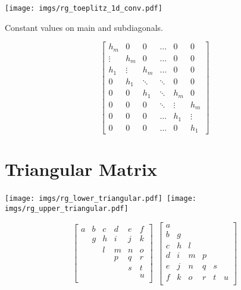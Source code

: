 \begin{center}
\texttt{[image: imgs/rg\_toeplitz\_1d\_conv.pdf]}
\end{center}

Constant values on main and subdiagonals.

\begin{equation}
\begin{bmatrix}
  h_m &   0 &   0 &      \hdots &   0 &   0 \\
  \vdots & h_m &   0 &   \hdots &   0 &   0 \\
  h_1 & \vdots & h_m &   \hdots &   0 &   0 \\
    0 & h_1 & \ddots & \ddots &   0 &   0 \\
    0 &   0 & h_1 &    \ddots & h_m &   0 \\
    0 &   0 &   0 &    \ddots & \vdots & h_m \\
    0 &   0 &   0 &      \hdots & h_1 & \vdots \\
    0 &   0 &   0 &      \hdots &   0 & h_1
\end{bmatrix}
\end{equation}


\section{Triangular Matrix}

\begin{center}
\texttt{[image: imgs/rg\_lower\_triangular.pdf]}~\texttt{[image: imgs/rg\_upper\_triangular.pdf]}
\end{center}

\begin{equation}
\begin{bmatrix}
a & b & c & d & e & f \\
  & g & h & i & j & k \\
  &   & l & m & n & o \\
  &   &   & p & q & r \\
  &   &   &   & s & t \\
  &   &   &   &   & u \\
\end{bmatrix}
~
~
\begin{bmatrix}
a &   &   &   &   &   \\
b & g &   &   &   &   \\
c & h & l &   &   &   \\
d & i & m & p &   &   \\
e & j & n & q & s &   \\
f & k & o & r & t & u \\
\end{bmatrix}
\end{equation}

